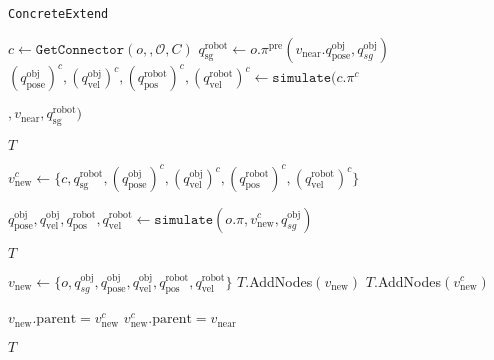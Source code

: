 \begin{algorithm}[H]
\caption{\texttt{ConcreteExtend}}\label{algo:Extend}
\begin{algorithmic}[1]

    \State $c \gets \texttt{GetConnector}(o,, \mathcal{O}, C)$
    \State ${q}^{\text{robot}}_{\text{sg}} \gets o.\pi^{\text{pre}}(v_{\text{near}}.q^{\text{obj}}_\text{pose}, {q}^{\text{obj}}_{sg})$
    \State $(q^{\text{obj}}_\text{pose})^c,(q^{\text{obj}}_\text{vel})^c, (q^{\text{robot}}_\text{pos})^c, (q^{\text{robot}}_\text{vel})^c \gets \texttt{simulate}( c.\pi^{c}$
    
    \hspace*{16.5em}$, v_{\text{near}}, {q}^{\text{robot}}_{\text{sg}})$

        \State \Return $T$
    \EndIf

    \State ${v^c_{\text{new}}} \gets \{c, q^{\text{robot}}_\text{sg}, (q^{\text{obj}}_\text{pose})^c,(q^{\text{obj}}_\text{vel})^c, (q^{\text{robot}}_\text{pos})^c, (q^{\text{robot}}_\text{vel})^c\}$

    \State $q^{\text{obj}}_\text{pose},q^{\text{obj}}_\text{vel}, q^{\text{robot}}_\text{pos}, q^{\text{robot}}_\text{vel} \gets \texttt{simulate}(o.\pi, v^c_\text{new}, {q}^{\text{obj}}_{sg})$

        \State \Return $T$
    \EndIf

    \State ${v_{\text{new}}} \gets \{o, q^\text{obj}_{sg}, q^{\text{obj}}_\text{pose},q^{\text{obj}}_\text{vel}, q^{\text{robot}}_\text{pos}, q^{\text{robot}}_\text{vel}\}$
    \State $T$.AddNodes$({v}_{\text{new}})$
    \State $T$.AddNodes$({v}^c_{\text{new}})$

    \State $v_{\text{new}}.\text{parent} = v^c_{\text{new}}$
    \State $v^c_{\text{new}}.\text{parent} = v_{\text{near}}$

    \State \Return $T$
\EndProcedure

\end{algorithmic}
\end{algorithm}
